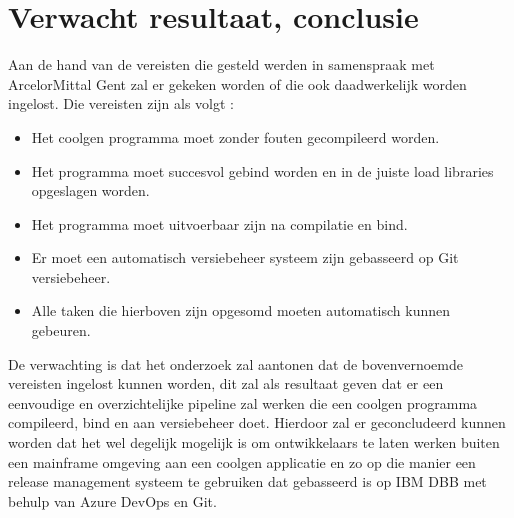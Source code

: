 \section{Verwacht resultaat, conclusie}%
\label{sec:verwachte_resultaten}

Aan de hand van de vereisten die gesteld werden in samenspraak met ArcelorMittal Gent zal er gekeken worden of die ook daadwerkelijk worden ingelost. 
Die vereisten zijn als volgt :
\begin{itemize}
  \item Het coolgen programma moet zonder fouten gecompileerd worden.
  \item Het programma moet succesvol gebind worden en in de juiste load libraries opgeslagen worden. 
  \item Het programma moet uitvoerbaar zijn na compilatie en bind.
  \item Er moet een automatisch versiebeheer systeem zijn gebasseerd op Git versiebeheer.
  \item Alle taken die hierboven zijn opgesomd moeten automatisch kunnen gebeuren.
\end{itemize}

De verwachting is dat het onderzoek zal aantonen dat de bovenvernoemde vereisten ingelost kunnen worden, dit zal als resultaat geven dat er een eenvoudige en overzichtelijke pipeline zal 
werken die een coolgen programma compileerd, bind en aan versiebeheer doet. 
Hierdoor zal er geconcludeerd kunnen worden dat het wel degelijk mogelijk is om ontwikkelaars te laten werken buiten een mainframe omgeving aan een coolgen applicatie en zo op die manier een 
release management systeem te gebruiken dat gebasseerd is op IBM DBB met behulp van Azure DevOps en Git.